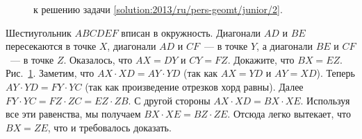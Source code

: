 \ifsolution
\begin{figure}\centering
    \caption{к решению задачи \ref{solution:2013/ru/pers-geomt/junior/2}.}
    \label{fig:solution:2013/ru/pers-geomt/junior/2}
\end{figure}%
\fi %

\problem
Шестиугольник $ABCDEF$ вписан в окружность.
Диагонали $AD$ и $BE$ пересекаются в точке $X$, диагонали $AD$ и $CF$~--- в
точке $Y$, а диагонали $BE$ и $CF$~--- в точке $Z$.
Оказалось, что $AX = DY$ и $CY = FZ$.
Докажите, что $BX = EZ$.
\solution
\label{solution:2013/ru/pers-geomt/junior/2}
Рис.~\ref{fig:solution:2013/ru/pers-geomt/junior/2}.
Заметим, что $AX \cdot XD = AY \cdot YD$ (так как $AX=YD$ и $AY=XD$).
Теперь $AY \cdot YD = FY \cdot YC$ (так как произведение отрезков хорд равны).
Далее $FY \cdot YC = FZ \cdot ZC = EZ \cdot ZB$.
С другой стороны $AX \cdot XD = BX \cdot XE$.
Используя все эти равенства, мы получаем $BX \cdot XE = BZ \cdot ZE$.
Отсюда легко вытекает, что $BX = ZE$, что и требовалось доказать.
\endproblem
